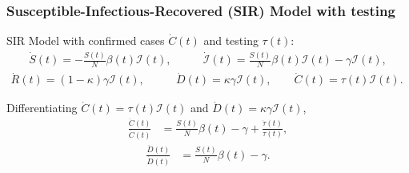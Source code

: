 \documentclass{beamer}
\def\icolor{\color{magenta}}
\def\ycolor{\color{red}}
\providecommand{\Infected}{{\mathcal{I}}}
\providecommand{\Recovered}{{R}}
\begin{document}


\begin{frame}
  \frametitle{Susceptible-Infectious-Recovered (SIR)  Model with testing}\vspace{-0.05cm}
   
 SIR Model with confirmed cases $ \dot{C}(t)$ and testing $\tau(t)$:\bigskip
\begin{align*}
  \dot{S}(t)  = -\frac{S(t)}{N} \beta(t) \Infected(t),\qquad 
 & \dot{\Infected}(t)   = \frac{S(t)}{N} \beta(t) \Infected(t) - \gamma  \Infected(t), 
 \end{align*}
 \begin{align*}
  \dot{\Recovered}(t)   = (1-\kappa) \gamma  \Infected(t),\qquad %
 &  \dot{D}(t) = \kappa \gamma \Infected(t), %
\qquad \dot{C}(t) = \tau(t) \Infected(t). \qquad
\end{align*}\smallskip
 
  
  Differentiating  { $\dot{C}(t) = \tau(t) \Infected(t)$} and $ \dot{D}(t) = \kappa \gamma \Infected(t)$,\bigskip
  \begin{align*}
    \frac{\ddot{C}(t)}{\dot{C}(t)}
              & =
                \frac{S(t)}{N} \beta(t) -\gamma  + \frac{\dot{\tau}(t)}{\tau(t)},
                \end{align*} 
                  \begin{align*}
    \frac{\ddot{D}(t)}{\dot{D}(t)}
              & =
                \frac{S(t)}{N} \beta(t) -\gamma.
                \end{align*}
                
                
 
 


 
\end{frame}
\end{document}
